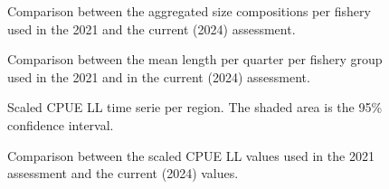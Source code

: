 \documentclass[
]{scrartcl}
\begin{document}
\newpage{}

\begin{figure}


\caption{\label{fig-comp-agg-size}Comparison between the aggregated size
compositions per fishery used in the 2021 and the current (2024)
assessment.}

\end{figure}%

\newpage{}

\begin{figure}


\caption{\label{fig-comp-mlen}Comparison between the mean length per
quarter per fishery group used in the 2021 and in the current (2024)
assessment.}

\end{figure}%

\newpage{}

\begin{figure}


\caption{\label{fig-ts-cpue}Scaled CPUE LL time serie per region. The
shaded area is the 95\% confidence interval.}

\end{figure}%

\newpage{}

\begin{figure}


\caption{\label{fig-comp-cpue}Comparison between the scaled CPUE LL
values used in the 2021 assessment and the current (2024) values.}

\end{figure}%
\end{document}
